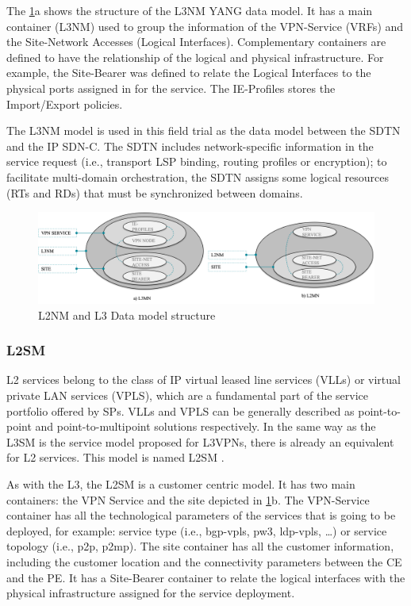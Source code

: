 \documentclass[a4paper,fleqn]{cas-dc}
\begin{document}
The \cref{FIG:l3nm}a shows the structure of the L3NM YANG data model. It has a  main container (L3NM) used to group the information of the VPN-Service (VRFs) and the Site-Network Accesses (Logical Interfaces). Complementary containers are defined to have the relationship of the logical and physical infrastructure. For example, the Site-Bearer was defined to relate the Logical Interfaces to the physical ports assigned in for the service. The IE-Profiles stores the Import/Export policies.  

The L3NM model is used in this field trial as the data model between the SDTN and the IP SDN-C. The SDTN includes network-specific information in the service request (i.e., transport LSP binding, routing profiles or encryption); to facilitate multi-domain orchestration, the SDTN assigns some logical resources (RTs and RDs) that must be synchronized between domains.

\begin{figure}
	\centering
		\includegraphics[scale=0.55]{figs/L3NM_L2NM.png}
	\caption{L2NM and L3 Data model structure}
	\label{FIG:l3nm} 
\end{figure}

\subsubsection{L2SM}
\label{section:l2nm}

L2 services belong to the class of IP virtual leased line services (VLLs) or virtual private LAN services (VPLS)\cite{andersson2006framework}, which are a fundamental part of the service portfolio offered by SPs. VLLs and VPLS can be generally described as point-to-point and point-to-multipoint solutions respectively. In the same way as the L3SM is the service model proposed for L3VPNs, there is already an equivalent for L2 services. This model is named L2SM \cite{wen2018yang}. 

As with the L3, the L2SM is a customer centric model. It has two main containers: the VPN Service and the site depicted in \cref{FIG:l3nm}b. The VPN-Service container has all the technological parameters of the services that is going to be deployed, for example: service type (i.e., bgp-vpls, pw3, ldp-vpls, \dots) or service topology (i.e., p2p, p2mp). The site container has all the customer information, including the customer location and the connectivity parameters between the CE and the PE. It has a Site-Bearer container to relate the logical interfaces with the physical infrastructure assigned for the service deployment.
\end{document}
